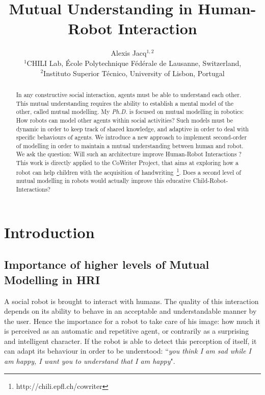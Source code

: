 \documentclass[10pt,a4paper]{article}
\begin{document}
\title{Mutual Understanding in Human-Robot Interaction}


\author{Alexis Jacq$^{1,2}$\\
$^1$CHILI Lab, \'Ecole Polytechnique F\'ed\'erale de Lausanne, Switzerland,\\
$^2$Instituto Superior T\'{e}cnico, University of Lisbon, Portugal}



\maketitle
\begin{abstract}
In any constructive social interaction, agents must be able to understand each other. This mutual understanding requires the ability to establish a mental model of the other, called mutual modelling. My \textit{Ph.D.} is focused on mutual modelling in robotics: How robots can model other agents within social activities? Such models must be dynamic in order to keep track of shared knowledge, and adaptive in order to deal with specific behaviours of agents. We introduce a new approach to implement second-order of modelling in order to maintain a mutual understanding between human and robot. We ask the question: Will such an architecture improve Human-Robot Interactions ?
This work is directly applied to the CoWriter Project, that aims at exploring how a robot can help children with the acquisition of handwriting~\footnote{http://chili.epfl.ch/cowriter}. Does a second level of mutual modelling in robots would actually improve this educative Child-Robot-Interactions?
\end{abstract}


\section{Introduction}
\subsection{Importance of higher levels of Mutual Modelling in HRI}

A social robot is brought to interact with humans. The quality of this interaction depends on its ability to behave in an acceptable and understandable manner by the user. Hence the importance for a robot to take care of his image: how much it is perceived as an automatic and repetitive agent, or contrarily as a surprising and intelligent character. If the robot is able to detect this perception of itself, it can adapt its behaviour in order to be understood: ``\textit{you think I am sad while I am happy, I want you to understand that I am happy}". 
\end{document}

